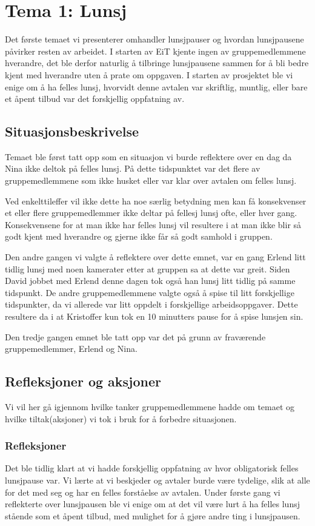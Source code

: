\chapter{Tema 1: Lunsj}
Det første temaet vi presenterer omhandler lunsjpauser og hvordan lunsjpausene påvirker resten av arbeidet. I starten av EiT kjente ingen av gruppemedlemmene hverandre, det ble derfor naturlig å tilbringe lunsjpausene sammen for å bli bedre kjent med hverandre uten å prate om oppgaven. I starten av prosjektet ble vi enige om å ha felles lunsj, hvorvidt denne avtalen var skriftlig, muntlig, eller bare et åpent tilbud var det forskjellig oppfatning av.

\section{Situasjonsbeskrivelse}
Temaet ble først tatt opp som en situasjon vi burde reflektere over en dag da Nina ikke deltok på felles lunsj. På dette tidspunktet var det flere av gruppemedlemmene som ikke husket eller var klar over avtalen om felles lunsj. 

Ved enkelttileffer vil ikke dette ha noe særlig betydning men kan få konsekvenser et eller flere gruppemedlemmer ikke deltar på fellesj lunsj ofte, eller hver gang. Konsekvensene for at man ikke har felles lunsj vil resultere i at man ikke blir så godt kjent med hverandre og gjerne ikke får så godt samhold i gruppen. 

Den andre gangen vi valgte å reflektere over dette emnet, var en gang Erlend litt tidlig lunsj med noen kamerater etter at gruppen sa at dette var greit. Siden David jobbet med Erlend denne dagen tok også han lunsj litt tidlig på samme tidspunkt. De andre gruppemedlemmene valgte også å spise til litt forskjellige tidspunkter, da vi allerede var litt oppdelt i forskjellige arbeidsoppgaver. Dette resultere da i at Kristoffer kun tok en 10 minutters pause for å spise lunsjen sin. 

Den tredje gangen emnet ble tatt opp var det på grunn av fraværende gruppemedlemmer, Erlend og Nina. 


\section{Refleksjoner og aksjoner}
Vi vil her gå igjennom hvilke tanker gruppemedlemmene hadde om temaet og hvilke tiltak(aksjoner) vi tok i bruk for å forbedre situasjonen.

\subsection*{Refleksjoner}
Det ble tidlig klart at vi hadde forskjellig oppfatning av hvor obligatorisk felles lunsjpause var. Vi lærte at vi beskjeder og avtaler burde være tydelige, slik at alle for det med seg og har en felles forståelse av avtalen. Under første gang vi reflekterte over lunsjpausen ble vi enige om at det vil være lurt å ha felles lunsj stående som et åpent tilbud, med mulighet for å gjøre andre ting i lunsjpausen.

